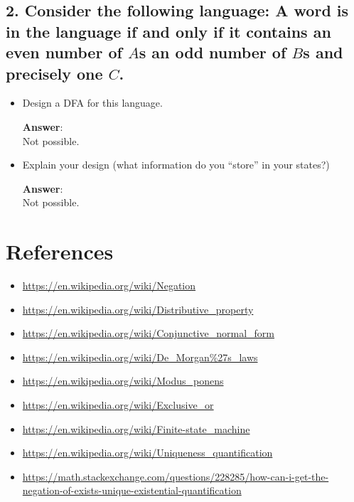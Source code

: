 \documentclass[a4paper, 14pt]{report}
\newcommand{\answer}[1]{%
	\begin{flushleft}
		\textbf{Answer}:\\
			#1
	\end{flushleft}}
\newcommand{\question}[1]{\subsection*{#1}}
\begin{document}
\pagebreak

\question{2. Consider the following language: A word is in the language if
  and only if it contains an even number of $A$s an odd number of $B$s and precisely one $C$.}

\begin{itemize}		
	\item Design a DFA for this language. \\
		\answer{Not possible.} 
	\item Explain your design (what information do you ``store'' in your states?) \\
		\answer{Not possible.} 
\end{itemize}

\pagebreak

\section*{References}

\begin{itemize}[noitemsep]		
  \item \url{https://en.wikipedia.org/wiki/Negation}
	\item \url{https://en.wikipedia.org/wiki/Distributive\_property}
	\item \url{https://en.wikipedia.org/wiki/Conjunctive\_normal\_form}
	\item \url{https://en.wikipedia.org/wiki/De\_Morgan\%27s\_laws}
	\item \url{https://en.wikipedia.org/wiki/Modus\_ponens}
	\item \url{https://en.wikipedia.org/wiki/Exclusive\_or}
	\item \url{https://en.wikipedia.org/wiki/Finite-state\_machine}
	\item \url{https://en.wikipedia.org/wiki/Uniqueness\_quantification}
	\item \url{https://math.stackexchange.com/questions/228285/how-can-i-get-the-negation-of-exists-unique-existential-quantification}
\end{itemize}		
\end{document}
